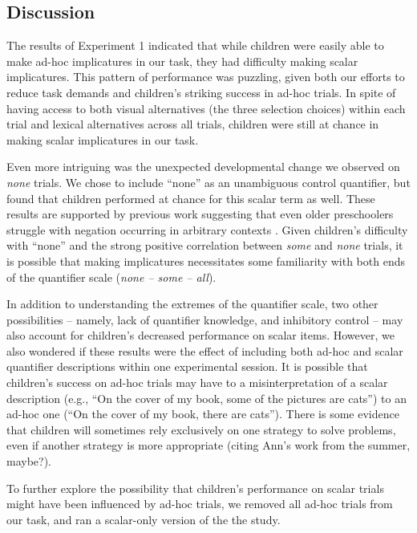 \documentclass[man]{apa2}
\begin{document}
\subsection{Discussion}

The results of Experiment 1 indicated that while children were easily able to make ad-hoc implicatures in our task, they had difficulty making scalar implicatures. This pattern of performance was puzzling, given both our efforts to reduce task demands and children's striking success in ad-hoc trials. In spite of having access to both visual alternatives (the three selection choices) within each trial and lexical alternatives across all trials, children were still at chance in making scalar implicatures in our task. 

Even more intriguing was the unexpected developmental change we observed on \textit{none} trials. We chose to include ``none'' as an unambiguous control quantifier, but found that children performed at chance for this scalar term as well. These results are supported by previous work suggesting that even older preschoolers struggle with negation occurring in arbitrary contexts \cite{nordmeyer2014}. Given children's difficulty with ``none'' and the strong positive correlation between \textit{some} and \textit{none} trials, it is possible that making implicatures necessitates some familiarity with both ends of the quantifier scale (\textit{none -- some -- all}).

In addition to understanding the extremes of the quantifier scale, two other possibilities -- namely, lack of quantifier knowledge, and inhibitory control -- may also account for children's decreased performance on scalar items. However, we also wondered if these results were the effect of including both ad-hoc and scalar quantifier descriptions within one experimental session. It is possible that children's success on ad-hoc trials may have to a misinterpretation of a scalar description (e.g., ``On the cover of my book, some of the pictures are cats'') to an ad-hoc one (``On the cover of my book, there are cats''). There is some evidence that children will sometimes rely exclusively on one strategy to solve problems, even if another strategy is more appropriate (citing Ann's work from the summer, maybe?). 

To further explore the possibility that children's performance on scalar trials might have been influenced by ad-hoc trials, we removed all ad-hoc trials from our task, and ran a scalar-only version of the the study.
\end{document}
